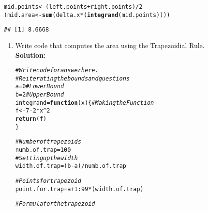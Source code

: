 \documentclass{article}\usepackage[]{graphicx}\usepackage[]{xcolor}
\makeatletter
\newcommand{\hlnum}[1]{\textcolor[rgb]{0.686,0.059,0.569}{#1}}%
\newcommand{\hlcom}[1]{\textcolor[rgb]{0.678,0.584,0.686}{\textit{#1}}}%
\newcommand{\hlopt}[1]{\textcolor[rgb]{0,0,0}{#1}}%
\newcommand{\hldef}[1]{\textcolor[rgb]{0.345,0.345,0.345}{#1}}%
\newcommand{\hlkwa}[1]{\textcolor[rgb]{0.161,0.373,0.58}{\textbf{#1}}}%
\newcommand{\hlkwb}[1]{\textcolor[rgb]{0.69,0.353,0.396}{#1}}%
\newcommand{\hlkwc}[1]{\textcolor[rgb]{0.333,0.667,0.333}{#1}}%
\newcommand{\hlkwd}[1]{\textcolor[rgb]{0.737,0.353,0.396}{\textbf{#1}}}%
\newenvironment{kframe}{%
 \def\at@end@of@kframe{}%
 \ifinner\ifhmode%
  \def\at@end@of@kframe{\end{minipage}}%
  \begin{minipage}{\columnwidth}%
 \fi\fi%
 \def\FrameCommand##1{\hskip\@totalleftmargin \hskip-\fboxsep
 \colorbox{shadecolor}{##1}\hskip-\fboxsep
     \hskip-\linewidth \hskip-\@totalleftmargin \hskip\columnwidth}%
 \MakeFramed {\advance\hsize-\width
   \@totalleftmargin\z@ \linewidth\hsize
   \@setminipage}}%
 {\par\unskip\endMakeFramed%
 \at@end@of@kframe}
\newenvironment{knitrout}{}{} %
\makeatother
\begin{document}
\begin{enumerate}
\begin{knitrout}
\begin{kframe}
\begin{alltt}
\hldef{mid.points} \hlkwb{<-} \hldef{(left.points}\hlopt{+}\hldef{right.points)}\hlopt{/}\hlnum{2}
\hldef{(mid.area} \hlkwb{<-} \hlkwd{sum}\hldef{(delta.x}\hlopt{*}\hldef{(}\hlkwd{integrand}\hldef{(mid.points))))}
\end{alltt}
\begin{verbatim}
## [1] 8.6668
\end{verbatim}
\end{kframe}
\end{knitrout}
\newpage
\begin{enumerate}
  \item Write code that computes the area using the Trapezoidial Rule.\\
  \textbf{Solution:}
\begin{knitrout}\scriptsize
{}\color{fgcolor}\begin{kframe}
\begin{alltt}
\hlcom{# Write code for answer here.}
\hlcom{#Reiterating the bounds and questions}
\hldef{a} \hlkwb{=} \hlnum{0} \hlcom{#Lower Bound}
\hldef{b} \hlkwb{=} \hlnum{2} \hlcom{#Upper Bound }
\hldef{integrand} \hlkwb{=} \hlkwa{function}\hldef{(}\hlkwc{x}\hldef{)\{} \hlcom{#Making the Function}
  \hldef{f} \hlkwb{<-} \hlnum{7} \hlopt{-} \hlnum{2} \hlopt{*} \hldef{x}\hlopt{^}\hlnum{2}
  \hlkwd{return}\hldef{(f)}
\hldef{\}}

\hlcom{#Number of trapezoids}
\hldef{numb.of.trap} \hlkwb{=} \hlnum{100}
\hlcom{#Setting up the width}
\hldef{width.of.trap} \hlkwb{=} \hldef{(b}\hlopt{-}\hldef{a)}\hlopt{/}\hldef{numb.of.trap}

\hlcom{#Points for trapezoid}
\hldef{point.for.trap} \hlkwb{=} \hldef{a} \hlopt{+} \hlnum{1}\hlopt{:}\hlnum{99}\hlopt{*}\hldef{(width.of.trap)}

\hlcom{#Formula for the trapezoid}


\end{alltt}
\end{kframe}
\end{knitrout}
\end{enumerate}
\end{enumerate}
\end{document}
